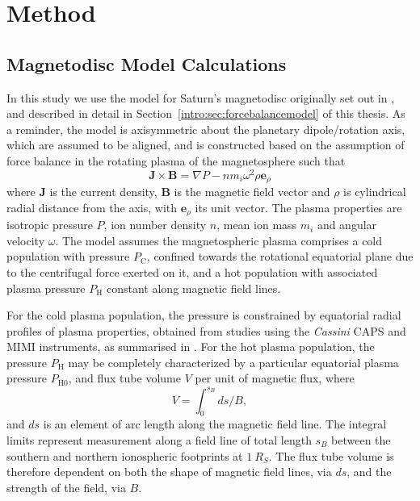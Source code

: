 \section{Method}\label{compress:sec:method}
\subsection{Magnetodisc Model Calculations}\label{compress:sec:model}
In this study we use the model for Saturn's magnetodisc originally set out in \citet{achilleos2010a}, and described in detail in Section~\ref{intro:sec:forcebalancemodel} of this thesis. As a reminder, the model is axisymmetric about the planetary dipole/rotation axis, which are assumed to be aligned, and is constructed based on the assumption of force balance in the rotating plasma of the magnetosphere such that 
\begin{equation}\label{compress:eq:forcebalance}
\boldsymbol{J} \times \boldsymbol{B} = \nabla P - nm_i\omega^2\rho\boldsymbol{e}_\rho
\end{equation}
where $\boldsymbol{J}$ is the current density, $\boldsymbol{B}$ is the magnetic field vector and $\rho$ is cylindrical radial distance from the axis, with $\boldsymbol{e}_\rho$ its unit vector. The plasma properties are isotropic pressure $P$, ion number density $n$, mean ion mass $m_i$ and angular velocity $\omega$. The model assumes the magnetospheric plasma comprises a cold population with pressure $P_\mathrm{C}$, confined towards the rotational equatorial plane due to the centrifugal force exerted on it, and a hot population with associated plasma pressure $P_\mathrm{H}$ constant along magnetic field lines. 

For the cold plasma population, the pressure is constrained by equatorial radial profiles of plasma properties, obtained from studies using the \textit{Cassini} CAPS and MIMI instruments, as summarised in \citet{achilleos2010a,achilleos2010b}. For  the hot plasma population, the pressure $P_\mathrm{H}$ may be completely characterized by a particular equatorial plasma pressure $P_\mathrm{H0}$, and flux tube volume $V$ per unit of magnetic flux, where
\begin{equation}\label{compress:eq:ftv}
V = \int_{0}^{s_{B}} ds/B, 
\end{equation}
and $ds$ is an element of arc length along the magnetic field line. The integral limits represent measurement along a field line of total length $s_B$ between the southern and northern ionospheric footprints at $\SI{1}{R_S}$. The flux tube volume is therefore dependent on both the shape of magnetic field lines, via $ds$, and the strength of the field, via $B$. 

